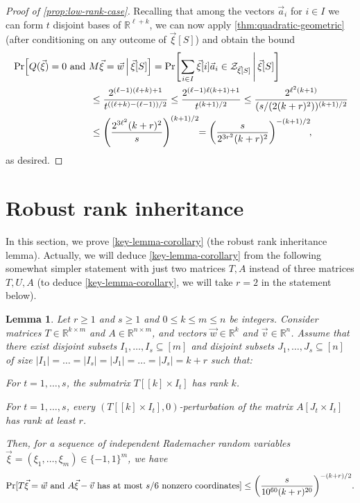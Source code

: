 \documentclass[english]{article}
\newtheorem{lemma}[theorem]{Lemma}
\theoremstyle{remark}
\numberwithin{equation}{section}
\numberwithin{figure}{section}
\newcommand{\su}{\subseteq}
\newcommand{\RR}{\mathbb{R}}
\let\originalleft\left
\let\originalright\right
\renewcommand{\left}{\mathopen{}\mathclose\bgroup\originalleft}
\renewcommand{\right}{\aftergroup\egroup\originalright}
\begin{document}
\begin{proof}[Proof of \cref{prop:low-rank-case}]
Recalling that among the vectors $\vec{a}_i$ for $i\in I$ we can form $t$ disjoint bases of $\mathbb{R}^{\ell+k}$, we can now apply \cref{thm:quadratic-geometric} (after conditioning on any outcome of $\vec \xi[S]$) and obtain the bound
\begin{align*}
&\Pr\Bigl[Q(\vec \xi)=0\text{ and }M\vec{\xi}=\vec{w}\,\Big|\, \vec \xi[S]\Bigr]=\Pr\Biggl[\sum_{i\in I}\vec \xi[i]\vec{a}_i\in \mathcal{Z}_{\vec \xi[S]}\,\Bigg|\, \vec \xi[S]\Biggr]\\
&\qquad\qquad\qquad\qquad\le \frac{2^{(\ell-1)(\ell+k)+1}}{t^{((\ell+k)-(\ell-1))/2}}\le \frac{2^{(\ell-1)\ell(k+1)+1}}{t^{(k+1)/2}}\le \frac{2^{\ell^2(k+1)}}{(s/(2(k+r)^2))^{(k+1)/2}}\\
&\qquad\qquad\qquad\qquad\le \left(\frac{2^{3\ell^2}(k+r)^2}{s}\right)^{(k+1)/2}\!\!= \left(\frac{s}{2^{3r^2}(k+r)^2}\right)^{-(k+1)/2}
\!,\end{align*}
as desired.
\end{proof}

\section{Robust rank inheritance}\label{sec:key-lemma}

In this section, we prove \cref{key-lemma-corollary} (the robust rank inheritance lemma). Actually, we will deduce \cref{key-lemma-corollary} from the following somewhat simpler statement with just two matrices $T,A$ instead of three matrices $T,U,A$ (to deduce \cref{key-lemma-corollary}, we will take $r=2$ in the statement below).

\begin{lemma}\label{key-lemma}
Let $r\ge 1$ and $s\ge 1$ and $0\le k\le m\le n$ be integers. Consider matrices $T\in \RR^{k\times m}$ and $A\in \RR^{n\times m}$, and vectors $\vec w\in\RR^{k}$ and $\vec v\in\RR^{n}$. Assume that there exist disjoint subsets $I_1,\dots,I_s\su [m]$ and disjoint subsets $J_1,\dots,J_s\su [n]$ of size $|I_1|=\dots=|I_s|=|J_1|=\dots=|J_s|=k+r$ such that:
\begin{compactitem}
    \item[(i)] For $t=1,\dots,s$, the submatrix $T[[k]\times I_t]$ has rank $k$. 
    \item[(ii)] For $t=1,\dots,s$, every $(T[[k]\times I_t],0)$-perturbation of the matrix $A[J_t\times I_t]$ has rank at least $r$.
\end{compactitem}
Then, for a sequence of independent Rademacher random variables $\vec{\xi}=(\xi_{1},\dots,\xi_{m})\in\{-1,1\}^{m}$,
we have
\begin{equation}\label{eq:key-lemma-equation}
\Pr[T\vec{\xi}=\vec{w}\text{ and }A\vec{\xi}-\vec{v}\text{ has at most }s/6\text{ nonzero coordinates}]\le\left(\frac{s}{10^{60}(k+r)^{20}}\right)^{-(k+r)/2}.
\end{equation}
\end{lemma}
\end{document}
